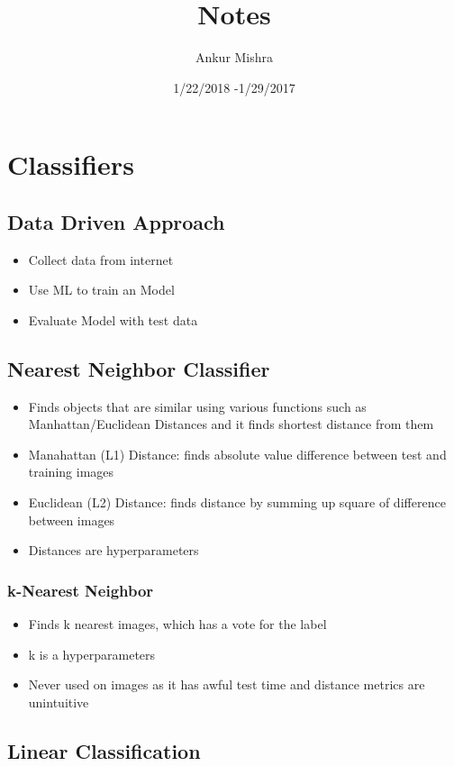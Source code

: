 \documentclass[11pt]{article}
\author{Ankur Mishra}
\date{1/22/2018 -1/29/2017}
\title{Notes}
\begin{document}
\maketitle
\tableofcontents

\section{Classifiers}
\label{sec-1}
\subsection{Data Driven Approach}
\label{sec-1-1}
\begin{itemize}
\item Collect data from internet
\item Use ML to train an Model
\item Evaluate Model with test data
\end{itemize}
\subsection{Nearest Neighbor Classifier}
\label{sec-1-2}
\begin{itemize}
\item Finds objects that are similar using various functions such as Manhattan/Euclidean Distances and it finds shortest distance from them
\item Manahattan (L1) Distance: finds absolute value difference between test and training images
\item Euclidean (L2) Distance: finds distance by summing up square of difference between images
\item Distances are hyperparameters
\end{itemize}
\subsubsection{k-Nearest Neighbor}
\label{sec-1-2-1}
\begin{itemize}
\item Finds k nearest images, which has a vote for the label
\item k is a hyperparameters
\item Never used on images as it has awful test time and distance metrics are unintuitive
\end{itemize}
\subsection{Linear Classification}
\label{sec-1-3}
\end{document}
